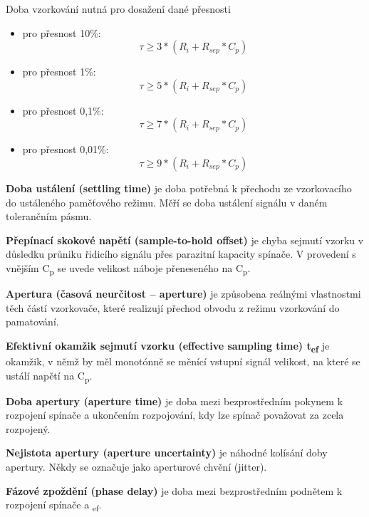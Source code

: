 Doba vzorkování nutná pro dosažení dané přesnosti
\begin{itemize}
\item pro přesnost 10\%: 
\begin{equation}
\tau \geq 3*(R_{i}+R_{sep}*C_{p})
\end{equation}
\item pro přesnost 1\%: 
\begin{equation}
\tau \geq 5*(R_{i}+R_{sep}*C_{p})
\end{equation}
\item pro přesnost 0,1\%: 
\begin{equation}
\tau \geq 7*(R_{i}+R_{sep}*C_{p})
\end{equation}
\item pro přesnost 0,01\%: 
\begin{equation}
\tau \geq 9*(R_{i}+R_{sep}*C_{p})
\end{equation}
\end{itemize}

\textbf{Doba ustálení (settling time)} je doba potřebná k přechodu ze vzorkovacího do ustáleného paměťového režimu. Měří se doba ustálení signálu v daném tolerančním pásmu.

\textbf{Přepínací skokové napětí (sample-to-hold offset)} je chyba sejmutí vzorku v důsledku
průniku řidicího signálu přes parazitní kapacity spínače. V provedení s vnějším C\textsubscript{p} se uvede
velikost náboje přeneseného na C\textsubscript{p}.

\textbf{Apertura (časová neurčitost – aperture)} je způsobena reálnými vlastnostmi těch částí
vzorkovače, které realizují přechod obvodu z režimu vzorkování do pamatování.

\textbf{Efektivní okamžik sejmutí vzorku (effective sampling time) t\textsubscript{ef}} je okamžik, v němž by
měl monotónně se měnící vstupní signál velikost, na které se ustálí napětí na C\textsubscript{p}.

\textbf{Doba apertury (aperture time)} je doba mezi bezprostředním pokynem k rozpojení
spínače a ukončením rozpojování, kdy lze spínač považovat za zcela rozpojený.

\textbf{Nejistota apertury (aperture uncertainty)} je náhodné kolísání doby apertury. Někdy se
označuje jako aperturové chvění (jitter).

\textbf{Fázové zpoždění (phase delay)} je doba mezi bezprostředním podnětem k rozpojení
spínače a \textsubscript{ef}.

